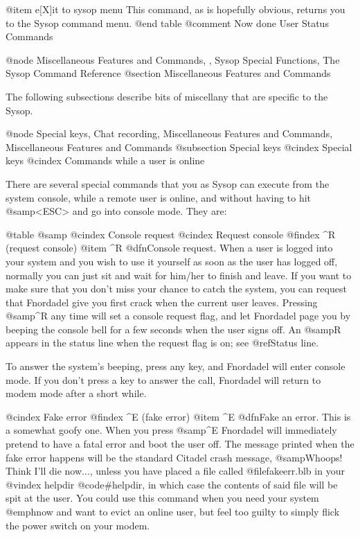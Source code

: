 @item e[X]it to sysop menu
This command, as is hopefully obvious, returns you
to the Sysop command menu.
@end table
@comment Now done User Status Commands

@node Miscellaneous Features and Commands,  , Sysop Special Functions, The Sysop Command Reference
@section Miscellaneous Features and Commands

The following subsections describe bits of miscellany that are
specific to the Sysop.

@node Special keys, Chat recording, Miscellaneous Features and Commands, Miscellaneous Features and Commands
@subsection Special keys
@cindex Special keys
@cindex Commands while a user is online

There are several special commands that you as Sysop can execute from the
system console, while a remote user is online, and without having to hit
@samp{<ESC>} and go into console mode.  They are:

@table @samp
@cindex Console request
@cindex Request console
@findex ^R (request console)
@item ^R
@dfn{Console request}.  When a user is logged into your system and you wish
to use it yourself as soon as the user has logged off, normally you can just
sit and wait for him/her to finish and leave.  If you want to make sure that
you don't miss your chance to catch the system, you can request that Fnordadel
give you first crack when the current user leaves.  Pressing @samp{^R} any
time will set a console request flag, and let Fnordadel page you by beeping
the console bell for a few seconds when the user signs off.  An @samp{R}
appears in the status line when the request flag is on; see @ref{Status line}.

To answer the system's beeping, press any key, and Fnordadel will enter
console mode.  If you don't press a key to answer the call, Fnordadel will
return to modem mode after a short while.

@cindex Fake error
@findex ^E (fake error)
@item ^E
@dfn{Fake an error}.  This is a somewhat goofy one.  When you press @samp{^E}
Fnordadel will immediately pretend to have a fatal error and boot the user
off.  The message printed when the fake error happens will be the standard
Citadel crash message, @samp{Whoops! Think I'll die now...}, unless you have
placed a file called @file{fakeerr.blb} in your
@vindex helpdir
@code{#helpdir}, in which case
the contents of said file will be spit at the user.  You could use this
command when you need your system @emph{now} and want to evict an online
user, but feel too guilty to simply flick the power switch on your modem.

